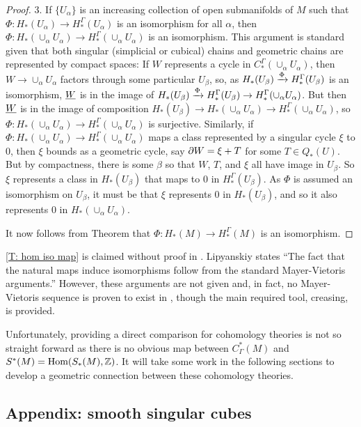 \begin{proof}
3. If $\{U_\alpha\}$ is an increasing collection of open submanifolds of $M$ such that $\Phi:H_*(U_\alpha) \to H_*^\Gamma(U_\alpha)$ is an isomorphism for all $\alpha$, then $\Phi:H_*(\cup_\alpha U_\alpha) \to H_*^\Gamma(\cup_\alpha U_\alpha)$ is an isomorphism. This argument is standard given that both singular (simplicial or cubical) chains and geometric chains are represented by compact spaces: If $W$ represents a cycle in $C_*^\Gamma(\cup_\alpha U_\alpha)$, then $W \to \cup_\alpha U_\alpha$ factors through some particular $U_\beta$, so, as $H_*(U_\beta)\xrightarrow{\Phi}H_*^\Gamma(U_\beta)$ is an isomorphism, $\underline{W}$ is in the image of $H_*(U_\beta)\xrightarrow{\Phi}H_*^\Gamma(U_\beta) \to H_*^\Gamma(\cup_\alpha U_\alpha)$. But then $\underline{W}$ is in the image of composition $H_*(U_\beta) \to H_*(\cup_\alpha U_\alpha) \to H_*^\Gamma(\cup_\alpha U_\alpha)$, so $\Phi:H_*(\cup_\alpha U_\alpha) \to H_*^\Gamma(\cup_\alpha U_\alpha)$ is surjective. Similarly, if $\Phi:H_*(\cup_\alpha U_\alpha) \to H_*^\Gamma(\cup_\alpha U_\alpha)$ maps a class represented by a singular cycle $\xi$ to $0$, then $\xi$ bounds as a geometric cycle, say $\partial W = \xi+T$ for some $T \in Q_*(U)$. But by compactness, there is some $\beta$ so that $W$, $T$, and $\xi$ all have image in $U_\beta$. So $\xi$ represents a class in $H_*(U_\beta)$ that maps to $0$ in $H_*^\Gamma(U_\beta)$. As $\Phi$ is assumed an isomorphism on $U_\beta$, it must be that $\xi$ represents $0$ in $H_*(U_\beta)$, and so it also represents $0$ in $H_*(\cup_\alpha U_\alpha)$.

It now follows from Theorem \cite[5.1.1]{Frie20} that $\Phi: H_*(M) \to H_*^\Gamma(M)$ is an isomorphism.
\end{proof}


\cref{T: hom iso map} is claimed without proof in \cite[Section 10]{Lipy14}. Lipyanskiy states ``The fact that the natural maps induce isomorphisms follow from the standard Mayer-Vietoris arguments.'' However, these arguments are not given and, in fact, no Mayer-Vietoris sequence is proven to exist in \cite{Lipy14}, though the main required tool, creasing, is provided.

Unfortunately, providing a direct comparison for cohomology theories is not so straight forward as there is no obvious map between $C^*_\Gamma(M)$ and $S^*(M) = \textup{Hom}(S_*(M),\mathbb{Z})$. It will take some work in the following sections to develop a geometric connection between these cohomology theories.


\subsection{Appendix: smooth singular cubes}


